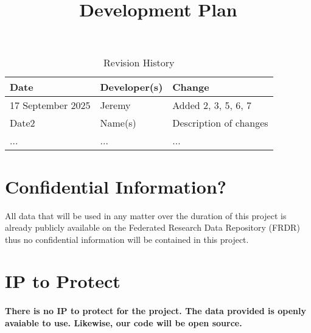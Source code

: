 \documentclass{article}
\title{Development Plan\\\progname}
\author{\authname}
\date{}
\begin{document}
\maketitle

\begin{table}[hp]
\caption{Revision History} \label{TblRevisionHistory}
\begin{tabularx}{\textwidth}{llX}
\toprule
\textbf{Date} & \textbf{Developer(s)} & \textbf{Change}\\
\midrule
17 September 2025 & Jeremy & Added 2, 3, 5, 6, 7\\
Date2 & Name(s) & Description of changes\\
... & ... & ...\\
\bottomrule
\end{tabularx}
\end{table}

\newpage{}



\section{Confidential Information?}


\par{All data that will be used in any matter over the duration of this project is already publicly available on the Federated Research Data Repository (FRDR)
thus no confidential information will be contained in this project.}

\section{IP to Protect}

\paragraph{There is no IP to protect for the project. The data provided is openly avaiable to use. Likewise, our code will be open source.}
\end{document}
